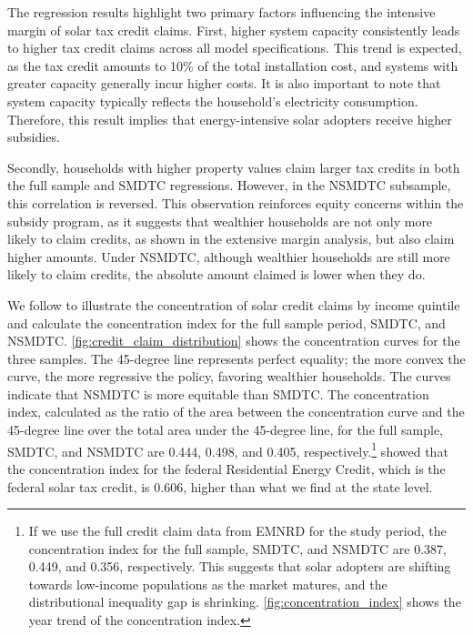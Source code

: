 \documentclass[11pt,twoside,letterpaper]{article}
\begin{document}
The regression results highlight two primary factors influencing the intensive margin of solar tax credit claims. First, higher system capacity consistently leads to higher tax credit claims across all model specifications. This trend is expected, as the tax credit amounts to 10\% of the total installation cost, and systems with greater capacity generally incur higher costs. It is also important to note that system capacity typically reflects the household’s electricity consumption. Therefore, this result implies that energy-intensive solar adopters receive higher subsidies.

Secondly, households with higher property values claim larger tax credits in both the full sample and SMDTC regressions. However, in the NSMDTC subsample, this correlation is reversed. This observation reinforces equity concerns within the subsidy program, as it suggests that wealthier households are not only more likely to claim credits, as shown in the extensive margin analysis, but also claim higher amounts. Under NSMDTC, although wealthier households are still more likely to claim credits, the absolute amount claimed is lower when they do. 


We follow \textcite{borenstein_distributional_2016} to illustrate the concentration of solar credit claims by income quintile and calculate the concentration index for the full sample period, SMDTC, and NSMDTC. \autoref{fig:credit_claim_distribution} shows the concentration curves for the three samples. The 45-degree line represents perfect equality; the more convex the curve, the more regressive the policy, favoring wealthier households. The curves indicate that NSMDTC is more equitable than SMDTC. The concentration index, calculated as the ratio of the area between the concentration curve and the 45-degree line over the total area under the 45-degree line, for the full sample, SMDTC, and NSMDTC are 0.444, 0.498, and 0.405, respectively.\footnote{If we use the full credit claim data from EMNRD for the study period, the concentration index for the full sample, SMDTC, and NSMDTC are 0.387, 0.449, and 0.356, respectively. This suggests that solar adopters are shifting towards low-income populations as the market matures, and the distributional inequality gap is shrinking. \autoref{fig:concentration_index} shows the year trend of the concentration index.} 
\textcite{borenstein_distributional_2016} showed that the concentration index for the federal Residential Energy Credit, which is the federal solar tax credit, is 0.606, higher than what we find at the state level. 
\end{document}
